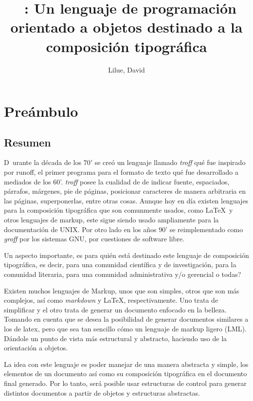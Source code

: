 \documentclass[12pt,letterpaper,titlepage,oneside,openright]{book}
\title{\ohtex \ : Un lenguaje de programación orientado a objetos destinado a la composición tipográfica}
\author{Lilue, David}
\newcommand{\nonumberchapter}[1]{
    \chapter*{#1}
    \addcontentsline{toc}{chapter}{#1}
}
\begin{document}
\frontmatter

\maketitle

\nonumberchapter{Preámbulo}

\section*{Resumen}

\lettrine[lines=2]{D}{}\ urante la década de los $70'$ se creó un lenguaje llamado \textit{troff} qué fue inspirado por
runoff, el primer programa para el formato de texto qué fue desarrollado a mediados
de los 60'. \textit{troff} posee la cualidad de de indicar fuente, espaciados,
párrafos, márgenes, pie de páginas, posicionar caracteres de manera arbitraria en las
páginas, superponerlas, entre otras cosas. Aunque hoy en día existen lenguajes para
la composición tipográfica que son comunmente usados, como \LaTeX \ y otros lenguajes de
markup, este sigue siendo usado ampliamente para la documentación de UNIX. Por otro
lado en los años 90' se reimplementado como \textit{groff} por los sistemas GNU, por
cuestiones de software libre. 

Un aspecto importante, es para quién está destinado este lenguaje de composición
tipográfica, es decir, para una comunidad científica y de investigación, para la
comunidad literaria, para una comunidad administrativa y/o gerencial o todas? 

Existen muchos lenguajes de Markup, unos que son simples, otros que son más
complejos, así como \textit{markdown} y \LaTeX, respectivamente. Uno trata de
simplificar y el otro trata de generar un documento enfocado en la belleza. Tomando
en cuenta que se desea la posibilidad de generar documentos similares a los de latex,
pero que sea tan sencillo cómo un lenguaje de markup ligero (LML). Dándole un punto
de vista más estructural y abstracto, haciendo uso de la orientación a objetos.

La idea con este lenguaje es poder manejar de una manera abstracta y simple, los
elementos de un documento así como su composición tipográfica en el documento final
generado. Por lo tanto, será posible usar estructuras de control para generar
distintos documentos a partir de objetos y estructuras abstractas.

\end{document}
